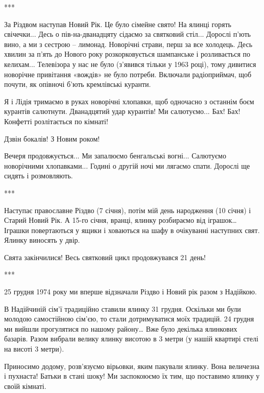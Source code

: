 ***

За Різдвом наступав Новий Рік. Це було сімейне свято! На ялинці горять
свічечки... Десь о пів-на-дванадцяту сідаємо за святковий стіл... Дорослі п’ють
вино, а ми з сестрою – лимонад. Новорічні страви, перш за все холодець. Десь
хвилин за п’ять до Нового року розкорковується шампанське і розливається по
келихам... Телевізора у нас не було (з’явився тільки  у 1963 році), тому дивитися
новорічне привітання «вождів» не було потреби. Включали радіоприймач, щоб
почути, як опівночі б’ють кремлівські куранти. 


Я і Лідія тримаємо в руках новорічні хлопавки, щоб одночасно з останнім боєм
курантів салютнути. Дванадцятий удар курантів! Ми салютуємо... Бах! Бах! Конфетті
розлітається по кімнаті! 

Дзвін бокалів! З Новим роком! 

Вечеря продовжується... Ми запалюємо бенгальські вогні... Салютуємо новорічними
хлопавками... Годині о другій ночі ми лягаємо спати. Дорослі ще сидять і
розмовляють.


***

Наступає православне Різдво (7 січня), потім мій день народження (10 січня) і
Старий Новий Рік. А 15-го січня, вранці, ялинку розбираємо від іграшок… Іграшки
повертаються у ящики і ховаються на шафу в очікуванні наступних свят. Ялинку
виносять у двір.

Свята закінчилися! Весь святковий цикл продовжувався 21 день!


***

25 грудня 1974 року ми вперше відзначали Різдво і Новий рік разом з Надійкою. 

В Надійчиній сім’ї традиційно ставили ялинку 31 грудня. Оскільки ми були
молодою самостійною сім’єю, то стали дотримуватися моїх традицій. 24 грудня ми
вийшли прогулятися по нашому району… Вже було декілька ялинкових базарів. Разом
вибрали велику ялинку висотою в 3 метри (у нашій квартирі стелі на висоті 3
метри). 


Приносимо додому, розв’язуємо вірьовки, яким пакували ялинку. Вона величезна і
пухнаста! Батьки в стані шоку! Ми заспокоюємо їх тим, що поставимо ялинку у
своїй кімнаті.

